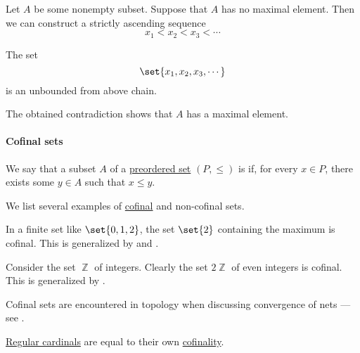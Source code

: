 \begin{defproof}
  Let \( A \) be some nonempty subset. Suppose that \( A \) has no maximal element. Then we can construct a strictly ascending sequence
  \begin{equation*}
    x_1 < x_2 < x_3 < \cdots
  \end{equation*}

  The set
  \begin{equation*}
    \set{ x_1, x_2, x_3, \cdots }
  \end{equation*}
  is an unbounded from above chain.

  The obtained contradiction shows that \( A \) has a maximal element.
\end{defproof}

\paragraph{Cofinal sets}

\begin{definition}\label{def:cofinal_set}
  We say that a subset \( A \) of a \hyperref[def:preordered_set]{preordered set} \( (P, \leq) \) is  if, for every \( x \in P \), there exists some \( y \in A \) such that \( x \leq y \).
\end{definition}

\begin{example}\label{ex:def:cofinal_set}
  We list several examples of \hyperref[def:cofinal_set]{cofinal} and non-cofinal sets.

  \begin{thmenum}
     In a finite set like \( \set{ 0, 1, 2 } \), the set \( \set{ 2 } \) containing the maximum is cofinal. This is generalized by  and .

     Consider the set \( \BbbZ \) of integers. Clearly the set \( 2\BbbZ \) of even integers is cofinal. This is generalized by .

     Cofinal sets are encountered in topology when discussing convergence of nets --- see .

     \hyperref[def:regular_cardinal]{Regular cardinals} are equal to their own \hyperref[def:cofinality]{cofinality}.
  \end{thmenum}
\end{example}

